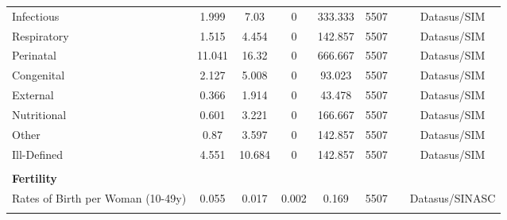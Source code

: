 \begin{table}[H]
\begin{footnotesize}
\begin{center}
{\begin{threeparttable}[b]
\begin{tabular}{rrrrrrrr}
    \multicolumn{1}{l}{Infectious} & \multicolumn{1}{c}{1.999} & \multicolumn{1}{c}{7.03} & \multicolumn{1}{c}{0} & \multicolumn{1}{c}{333.333} & \multicolumn{1}{c}{5507} &       & \multicolumn{1}{c}{Datasus/SIM} \\
    \multicolumn{1}{l}{Respiratory} & \multicolumn{1}{c}{1.515} & \multicolumn{1}{c}{4.454} & \multicolumn{1}{c}{0} & \multicolumn{1}{c}{142.857} & \multicolumn{1}{c}{5507} &       & \multicolumn{1}{c}{Datasus/SIM} \\
    \multicolumn{1}{l}{Perinatal} & \multicolumn{1}{c}{11.041} & \multicolumn{1}{c}{16.32} & \multicolumn{1}{c}{0} & \multicolumn{1}{c}{666.667} & \multicolumn{1}{c}{5507} &       & \multicolumn{1}{c}{Datasus/SIM} \\
    \multicolumn{1}{l}{Congenital} & \multicolumn{1}{c}{2.127} & \multicolumn{1}{c}{5.008} & \multicolumn{1}{c}{0} & \multicolumn{1}{c}{93.023} & \multicolumn{1}{c}{5507} &       & \multicolumn{1}{c}{Datasus/SIM} \\
    \multicolumn{1}{l}{External} & \multicolumn{1}{c}{0.366} & \multicolumn{1}{c}{1.914} & \multicolumn{1}{c}{0} & \multicolumn{1}{c}{43.478} & \multicolumn{1}{c}{5507} &       & \multicolumn{1}{c}{Datasus/SIM} \\
    \multicolumn{1}{l}{Nutritional} & \multicolumn{1}{c}{0.601} & \multicolumn{1}{c}{3.221} & \multicolumn{1}{c}{0} & \multicolumn{1}{c}{166.667} & \multicolumn{1}{c}{5507} &       & \multicolumn{1}{c}{Datasus/SIM} \\
    \multicolumn{1}{l}{Other} & \multicolumn{1}{c}{0.87} & \multicolumn{1}{c}{3.597} & \multicolumn{1}{c}{0} & \multicolumn{1}{c}{142.857} & \multicolumn{1}{c}{5507} &       & \multicolumn{1}{c}{Datasus/SIM} \\
    \multicolumn{1}{l}{Ill-Defined} & \multicolumn{1}{c}{4.551} & \multicolumn{1}{c}{10.684} & \multicolumn{1}{c}{0} & \multicolumn{1}{c}{142.857} & \multicolumn{1}{c}{5507} &       & \multicolumn{1}{c}{Datasus/SIM} \\
          &       &       &       &       &       &       &  \\
    \multicolumn{1}{l}{\textbf{Fertility}} &       &       &       &       &       &       &  \\
    \multicolumn{1}{l}{Rates of Birth per Woman (10-49y)} & \multicolumn{1}{c}{0.055} & \multicolumn{1}{c}{0.017} & \multicolumn{1}{c}{0.002} & \multicolumn{1}{c}{0.169} & \multicolumn{1}{c}{5507} &       & \multicolumn{1}{c}{Datasus/SINASC} \\
          &       &       &       &       &       &       &  \\

\end{tabular}
\end{threeparttable}}
\end{center}
\end{footnotesize}
\end{table}
